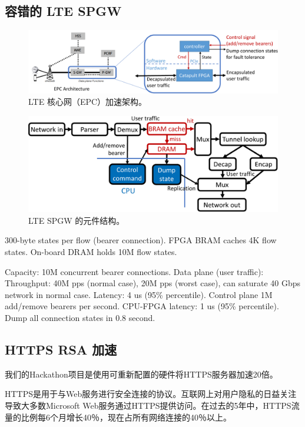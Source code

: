 \subsection{容错的 LTE SPGW}


\begin{figure}[htbp]
	\centering
	\includegraphics[width=1.0\textwidth]{image/EPC_arch}
	\caption{LTE 核心网（EPC）加速架构。}
	\label{clicknp:fig:epc-arch}
\end{figure}


\begin{figure}[htbp]
	\centering
	\includegraphics[width=1.0\textwidth]{image/EPC_element}
	\caption{LTE SPGW 的元件结构。}
	\label{clicknp:fig:epc-element}
\end{figure}

300-byte states per flow (bearer connection).
FPGA BRAM caches 4K flow states.
On-board DRAM holds 10M flow states.

Capacity:
10M concurrent bearer connections.
Data plane (user traffic):
Throughput: 40M pps (normal case), 20M pps (worst case), can saturate 40 Gbps network in normal case.
Latency: 4 us (95\% percentile).
Control plane
1M add/remove bearers per second.
CPU-FPGA latency: 1 us (95\% percentile).
Dump all connection states in 0.8 second.

\subsection{HTTPS RSA 加速}

我们的Hackathon项目是使用可重新配置的硬件将HTTPS服务器加速20倍。

HTTPS是用于与Web服务进行安全连接的协议。互联网上对用户隐私的日益关注导致大多数Microsoft Web服务通过HTTPS提供访问。在过去的5年中，HTTPS流量的比例每6个月增长40％，现在占所有网络连接的40％以上。

